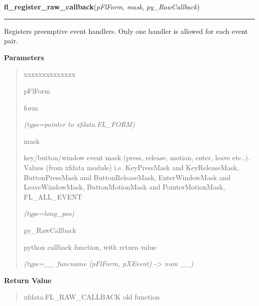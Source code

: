 \hspace{.8\funcindent}\begin{boxedminipage}{\funcwidth}

    \raggedright \textbf{fl\_register\_raw\_callback}(\textit{pFlForm}, \textit{mask}, \textit{py\_RawCallback})

    \vspace{-1.5ex}

    \rule{\textwidth}{0.5\fboxrule}
\setlength{\parskip}{2ex}
    Registers preemptive event handlers. Only one handler is allowed for 
    each event pair.

\setlength{\parskip}{1ex}
      \textbf{Parameters}
      \vspace{-1ex}

      \begin{quote}
        \begin{Ventry}{xxxxxxxxxxxxxx}

          \item[pFlForm]

          form

            {\it (type=pointer to xfdata.FL\_FORM)}

          \item[mask]

          key/button/window event mask (press, release, motion, enter, 
          leave etc..). Values (from xfdata module) i.e. KeyPressMask and 
          KeyReleaseMask, ButtonPressMask and ButtonReleaseMask, 
          EnterWindowMask and LeaveWindowMask, ButtonMotionMask and 
          PointerMotionMask, FL\_ALL\_EVENT

            {\it (type=long\_pos)}

          \item[py\_RawCallback]

          python callback function, with return value

            {\it (type=\_\_ funcname (pFlForm, pXEvent) -{\textgreater} num \_\_)}

        \end{Ventry}

      \end{quote}

      \textbf{Return Value}
    \vspace{-1ex}

      \begin{quote}
      xfdata.FL\_RAW\_CALLBACK old function

      \end{quote}


\end{boxedminipage}
